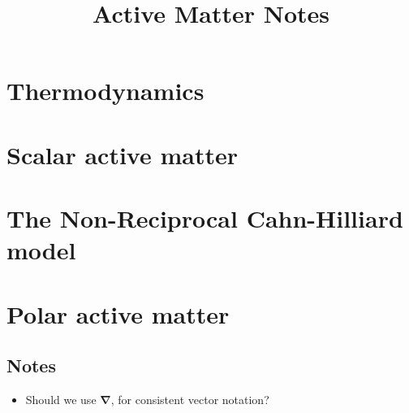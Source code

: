 \documentclass[10pt, a4paper, oneside]{book}
\title{Active Matter Notes}
\begin{document}
    \maketitle
    \clearpage


    \tableofcontents
    \clearpage

    \setlength{\parindent}{0em}
    \setlength{\parskip}{0.8em}


    
    
    \chapter{Thermodynamics}
     

    \chapter{Scalar active matter}
    

    \chapter{The Non-Reciprocal Cahn-Hilliard model}
    

    \chapter{Polar active matter}
    


    
    

    
    \setcounter{tocdepth}{1}
    \listoftodos
    
    \section*{Notes}
    \begin{itemize}
        \item Should we use $\bm \nabla$, for consistent vector notation?
    \end{itemize}
\end{document}
